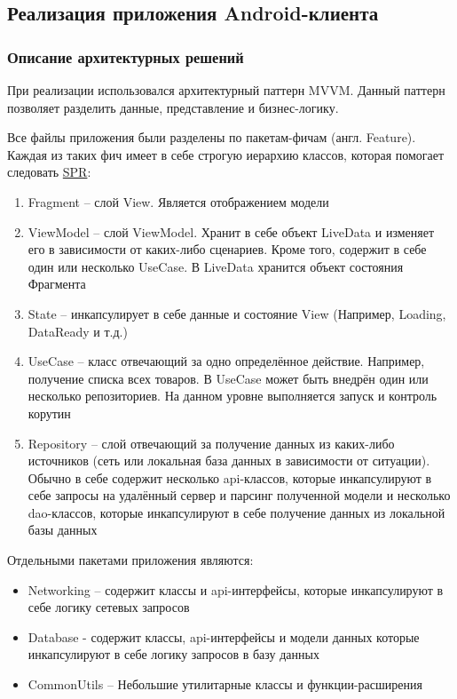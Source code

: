 \subsection{Реализация приложения Android-клиента}\label{subsec:3-impl-android}\indent

\subsubsection{Описание архитектурных решений}\indent

При реализации использовался архитектурный паттерн MVVM. Данный паттерн позволяет разделить данные, представление и бизнес-логику.

Все файлы приложения были разделены по пакетам-фичам (англ. Feature).
Каждая из таких фич имеет в себе строгую иерархию классов, которая помогает следовать \hyperlink{gloss:spr}{SPR}:
\begin{enumerate}
    \item Fragment – слой View.
    Является отображением модели
    \item ViewModel – слой ViewModel.
    Хранит в себе объект LiveData и изменяет его в зависимости от каких-либо сценариев.
    Кроме того, содержит в себе один или несколько UseCase.
    В LiveData хранится объект состояния Фрагмента
    \item State – инкапсулирует в себе данные и состояние View (Например, Loading, DataReady и т.д.)
    \item UseCase – класс отвечающий за одно определённое действие.
    Например, получение списка всех товаров.
    В UseCase может быть внедрён один или несколько репозиториев.
    На данном уровне выполняется запуск и контроль корутин
    \item Repository – слой отвечающий за получение данных из каких-либо источников (сеть или локальная база данных в зависимости от ситуации).
    Обычно в себе содержит несколько api-классов, которые инкапсулируют в себе запросы на удалённый сервер и парсинг полученной модели и несколько dao-классов, которые инкапсулируют в себе получение данных из локальной базы данных
\end{enumerate}

Отдельными пакетами приложения являются:
\begin{itemize}
    \item Networking – содержит классы и api-интерфейсы, которые инкапсулируют в себе логику сетевых запросов
    \item Database - содержит классы, api-интерфейсы и модели данных которые инкапсулируют в себе логику запросов в базу данных
    \item CommonUtils – Небольшие утилитарные классы и функции-расширения
\end{itemize}

